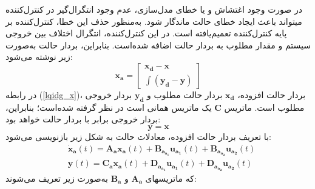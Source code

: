 در صورت وجود اغتشاش و یا خطای مدل‌سازی، عدم وجود انتگرال‌گیر در کنترل‌کننده
 میتواند باعث ایجاد خطای حالت ماندگار شود. به‌منظور حذف این خطا، کنترل‌کننده
 بر پایه کنترل‌کننده
 تعمیم‌یافته است. در این کنترل‌کننده، انتگرال اختلاف بین خروجی سیستم و مقدار مطلوب به بردار حالت اضافه شده‌است. بنابراین، بردار حالت به‌صورت زیر نوشته می‌شود:
 \begin{equation}\label{lqidg_x}
 	\boldsymbol{x_a} = \begin{bmatrix}
 		\boldsymbol{x_d} - \boldsymbol{x}\\
 		\displaystyle \int (\boldsymbol{y_d} - \boldsymbol{y})
 	\end{bmatrix}
 \end{equation}
در رابطه
(\ref{lqidg_x})،
بردار حالت افزوده،
$	\boldsymbol{x_d}$
بردار حالت مطلوب و
$	\boldsymbol{y_d}$
  بردار خروجی مطلوب است. ماتریس
  $	\boldsymbol{C}$
 یک ماتریس همانی است در نظر گرفته شده‌است؛ بنابراین، بردار خروجی برابر با بردار حالت خواهد
بود:
\begin{equation}
	\boldsymbol{y} = \boldsymbol{x}
\end{equation}
با تعریف بردار حالت افزوده، معادلات حالت به شكل زیر بازنویسی می‌شود:
 \begin{equation}\label{systemlqidg}
	\begin{split}
		&\boldsymbol{\dot x_a}(t) = \boldsymbol{A_ax_a}(t) + \boldsymbol{B_{a_{a_1}}u_{a_1}}(t) + \boldsymbol{B_{a_{a_2}}u_{a_2}}(t)%
		\\
		&\boldsymbol{y}(t) = \boldsymbol{C_ax_a}(t) + \boldsymbol{D_{a_{a_1}}u_{a_1}}(t) + \boldsymbol{D_{a_{a_2}}u_{a_2}}(t)
	\end{split}
\end{equation}
که ماتریسهای $\boldsymbol{A_a}$ و $\boldsymbol{B_a}$ به‌صورت زیر تعریف می‌شوند:


